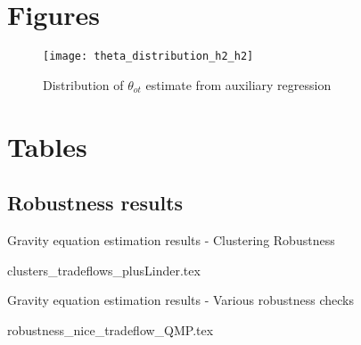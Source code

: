 \documentclass[12pt,a4paper,oneside,times]{article}   	%
\newcommand{\tablespath}{{"C:/Users/dhill/Dropbox/Dissertation"}}
\begin{document}
\newpage



\newpage
\appendix

\section{Figures}

\begin{figure}[H]
\caption{Distribution of $\theta_{ot}$ estimate from auxiliary regression}
\centering
\texttt{[image: theta\_distribution\_h2\_h2]}
\end{figure}

\section{Tables}
\subsection{Robustness results}

\begin{table}[H]\centering
\caption{Gravity equation estimation results - Clustering Robustness\label{t: gravity cluster}}
{clusters_tradeflows_plusLinder.tex}
\end{table}

\begin{landscape}
\begin{table}[H]\centering
\caption{Gravity equation estimation results - Various robustness checks \label{t: gravity robust}}
{robustness_nice_tradeflow_QMP.tex}
\end{table}
\end{landscape}



\end{document}
